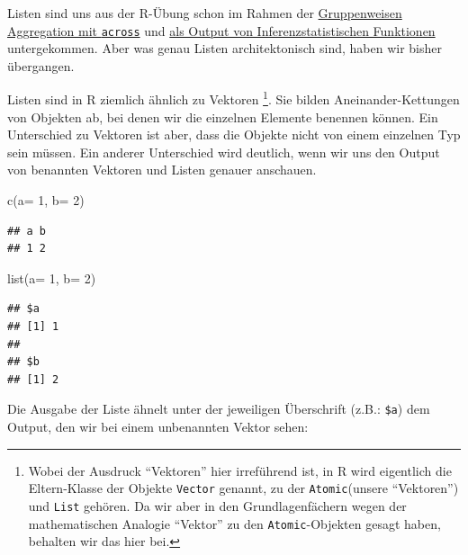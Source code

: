 \documentclass[
]{book}
\newenvironment{Shaded}{\begin{snugshade}}{\end{snugshade}}
\newcommand{\DecValTok}[1]{\textcolor[rgb]{0.00,0.00,0.81}{#1}}
\newcommand{\FunctionTok}[1]{\textcolor[rgb]{0.00,0.00,0.00}{#1}}
\newcommand{\NormalTok}[1]{#1}
\newcommand{\OtherTok}[1]{\textcolor[rgb]{0.56,0.35,0.01}{#1}}
\newcommand{\StringTok}[1]{\textcolor[rgb]{0.31,0.60,0.02}{#1}}
\begin{document}
Listen sind uns aus der R-Übung schon im Rahmen der \href{https://mbrede.github.io/CAU_Kiel_EDVI/aggregation-und-filemanagement.html\#lazy-evaluation}{Gruppenweisen Aggregation mit \texttt{across}} und \href{https://mbrede.github.io/CAU_KIEL_EDVII/einfache-lineare-zusammenh\%C3\%A4nge.html\#weitere-parameter}{als Output von Inferenzstatistischen Funktionen} untergekommen.
Aber was genau Listen architektonisch sind, haben wir bisher übergangen.

Listen sind in R ziemlich ähnlich zu Vektoren \footnote{Wobei der Ausdruck ``Vektoren'' hier irreführend ist, in R wird eigentlich die Eltern-Klasse der Objekte \texttt{Vector} genannt, zu der \texttt{Atomic}(unsere ``Vektoren'') und \texttt{List} gehören. Da wir aber in den Grundlagenfächern wegen der mathematischen Analogie ``Vektor'' zu den \texttt{Atomic}-Objekten gesagt haben, behalten wir das hier bei.}. Sie bilden Aneinander-Kettungen von Objekten ab, bei denen wir die einzelnen Elemente benennen können.
Ein Unterschied zu Vektoren ist aber, dass die Objekte nicht von einem einzelnen Typ sein müssen.
Ein anderer Unterschied wird deutlich, wenn wir uns den Output von benannten Vektoren und Listen genauer anschauen.

\begin{Shaded}
\begin{Highlighting}[]
\FunctionTok{c}\NormalTok{(}\StringTok{\textquotesingle{}a\textquotesingle{}}\OtherTok{=} \DecValTok{1}\NormalTok{,}
  \StringTok{\textquotesingle{}b\textquotesingle{}}\OtherTok{=} \DecValTok{2}\NormalTok{)}
\end{Highlighting}
\end{Shaded}

\begin{verbatim}
## a b 
## 1 2
\end{verbatim}

\begin{Shaded}
\begin{Highlighting}[]
\FunctionTok{list}\NormalTok{(}\StringTok{\textquotesingle{}a\textquotesingle{}}\OtherTok{=} \DecValTok{1}\NormalTok{,}
     \StringTok{\textquotesingle{}b\textquotesingle{}}\OtherTok{=} \DecValTok{2}\NormalTok{)}
\end{Highlighting}
\end{Shaded}

\begin{verbatim}
## $a
## [1] 1
## 
## $b
## [1] 2
\end{verbatim}

Die Ausgabe der Liste ähnelt unter der jeweiligen Überschrift (z.B.: \texttt{\$a}) dem Output, den wir bei einem unbenannten Vektor sehen:
\end{document}
